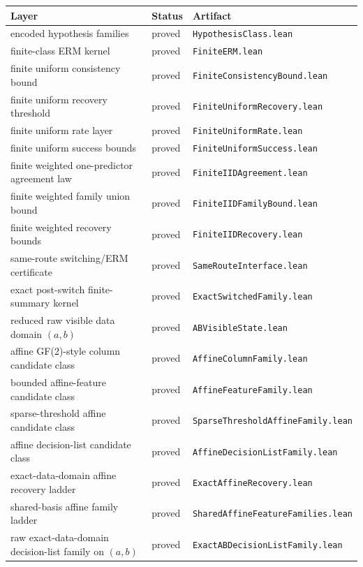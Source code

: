 \documentclass[11pt]{article}
\theoremstyle{remark}
\begin{document}
\begin{center}
\begin{tabular}{lll}
\toprule
\textbf{Layer} & \textbf{Status} & \textbf{Artifact} \\
\midrule
encoded hypothesis families & proved & \texttt{HypothesisClass.lean} \\
finite-class ERM kernel & proved & \texttt{FiniteERM.lean} \\
finite uniform consistency bound & proved & \texttt{FiniteConsistencyBound.lean} \\
finite uniform recovery threshold & proved & \texttt{FiniteUniformRecovery.lean} \\
finite uniform rate layer & proved & \texttt{FiniteUniformRate.lean} \\
finite uniform success bounds & proved & \texttt{FiniteUniformSuccess.lean} \\
finite weighted one-predictor agreement law & proved & \texttt{FiniteIIDAgreement.lean} \\
finite weighted family union bound & proved & \texttt{FiniteIIDFamilyBound.lean} \\
finite weighted recovery bounds & proved & \texttt{FiniteIIDRecovery.lean} \\
same-route switching/ERM certificate & proved & \texttt{SameRouteInterface.lean} \\
exact post-switch finite-summary kernel & proved & \texttt{ExactSwitchedFamily.lean} \\
reduced raw visible data domain $(a,b)$ & proved & \texttt{ABVisibleState.lean} \\
affine GF(2)-style column candidate class & proved & \texttt{AffineColumnFamily.lean} \\
bounded affine-feature candidate class & proved & \texttt{AffineFeatureFamily.lean} \\
sparse-threshold affine candidate class & proved & \texttt{SparseThresholdAffineFamily.lean} \\
affine decision-list candidate class & proved & \texttt{AffineDecisionListFamily.lean} \\
exact-data-domain affine recovery ladder & proved & \texttt{ExactAffineRecovery.lean} \\
shared-basis affine family ladder & proved & \texttt{SharedAffineFeatureFamilies.lean} \\
raw exact-data-domain decision-list family on $(a,b)$ & proved & \texttt{ExactABDecisionListFamily.lean} \\

\end{tabular}
\end{center}
\end{document}

